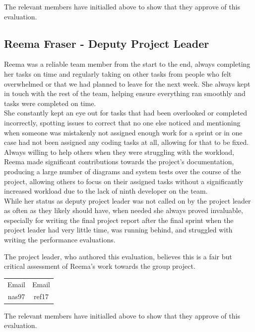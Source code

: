 \documentclass[a4paper]{project}
\begin{document}
			The relevant members have initialled above to show that they approve of this evaluation.
			
		\subsection{Reema Fraser - Deputy Project Leader}\label{subsec:performance-reema-fraser}
		
			Reema was a reliable team member from the start to the end, always completing her tasks on time and regularly taking on other tasks from people who felt overwhelmed or that we had planned to leave for the next week. She always kept in touch with the rest of the team, helping ensure everything ran smoothly and tasks were completed on time. \\
			She constantly kept an eye out for tasks that had been overlooked or completed incorrectly, spotting issues to correct that no one else noticed and mentioning when someone was mistakenly not assigned enough work for a sprint or in one case had not been assigned any coding tasks at all, allowing for that to be fixed. \\
			Always willing to help others when they were struggling with the workload, Reema made significant contributions towards the project's documentation, producing a large number of diagrams and system tests over the course of the project, allowing others to focus on their assigned tasks without a significantly increased workload due to the lack of ninth developer on the team. \\
			While her status as deputy project leader was not called on by the project leader as often as they likely should have, when needed she always proved invaluable, especially for writing the final project report after the final sprint when the project leader had very little time, was running behind, and struggled with writing the performance evaluations.
		
			The project leader, who authored this evaluation, believes this is a fair but critical assessment of Reema's work towards the group project.
			
			\begin{center}
				\setlength{\tabcolsep}{0.1\paperwidth}
				\begin{tabular}{c c}
					Email & Email  \\
					nas97 & ref17
				\end{tabular}
			\end{center}
			
			The relevant members have initialled above to show that they approve of this evaluation.
			
\end{document}
